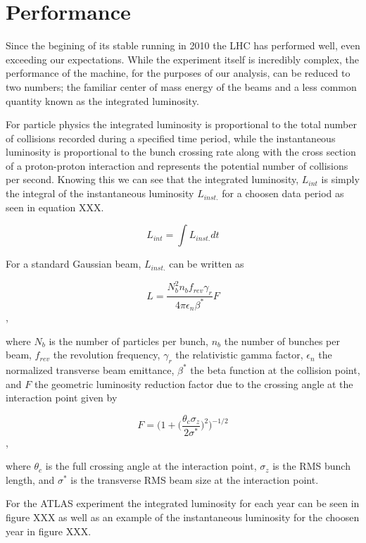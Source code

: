 \section{Performance} \label{sec:lhc:performance}

Since the begining of its stable running in 2010 the LHC has performed well,
even exceeding our expectations.  While the experiment itself is incredibly
complex, the performance of the machine, for the purposes of our analysis, can
be reduced to two numbers; the familiar center of mass energy of the beams and a
less common quantity known as the integrated luminosity.  

For particle physics the integrated luminosity is proportional to the total
number of collisions recorded during a specified time period, while the
instantaneous luminosity is proportional to the bunch crossing rate along with
the cross section of a proton-proton interaction and represents the potential
number of collisions per second.  Knowing this we can see that the integrated
luminosity, $L_{int}$ is simply the integral of the instantaneous luminosity
$L_{inst.}$ for a choosen data period as seen in equation XXX.

$$ L_{int} = \int L_{inst.}dt $$

For a standard Gaussian beam, $L_{inst.}$ can be written as

$$ L = \frac{N_{b}^{2}n_{b}f_{rev}\gamma_{r}}{4\pi\epsilon_{n}\beta^{*}}F $$,

where $N_{b}$ is the number of particles per bunch, $n_{b}$ the number of
bunches per beam, $f_{rev}$ the revolution frequency, $\gamma_{r}$ the
relativistic gamma factor, $\epsilon_{n}$ the normalized transverse beam
emittance, $\beta^{*}$ the beta function at the collision point, and $F$ the
geometric luminosity reduction factor due to the crossing angle at the
interaction point given by

$$ F = \bigg(1 + \Big( \frac{\theta_{c}\sigma_{z}}{2\sigma^{*}} \Big) ^{2}
\bigg)^{-1/2} $$,

where $\theta_{c}$ is the full crossing angle at the interaction point,
$\sigma_{z}$ is the RMS bunch length, and $\sigma^{*}$ is the transverse RMS
beam size at the interaction point.

For the ATLAS experiment the integrated luminosity for each year can be seen in
figure XXX as well as an example of the instantaneous luminosity for the choosen
year in figure XXX.
